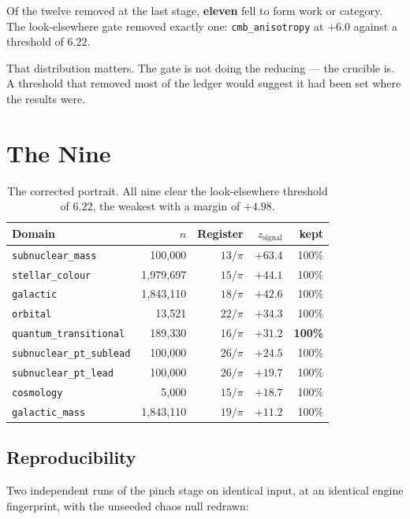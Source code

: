 \documentclass[11pt, letterpaper, openany]{book}
\begin{document}
Of the twelve removed at the last stage, \textbf{eleven} fell to form work or category. The
look-elsewhere gate removed exactly one: \texttt{cmb\_anisotropy} at $+6.0$ against a threshold
of $6.22$.

That distribution matters. The gate is not doing the reducing --- the crucible is. A threshold
that removed most of the ledger would suggest it had been set where the results were.

\section{The Nine}

\begin{table}[H]
\centering
\small
\begin{tabular}{@{}lrrrr@{}}
\toprule
\textbf{Domain} & \textbf{$n$} & \textbf{Register} & \textbf{$z_{\text{signal}}$} & \textbf{kept} \\
\midrule
\texttt{subnuclear\_mass} & 100{,}000 & $13/\pi$ & $+63.4$ & 100\% \\
\texttt{stellar\_colour} & 1{,}979{,}697 & $15/\pi$ & $+44.1$ & 100\% \\
\texttt{galactic} & 1{,}843{,}110 & $18/\pi$ & $+42.6$ & 100\% \\
\texttt{orbital} & 13{,}521 & $22/\pi$ & $+34.3$ & 100\% \\
\texttt{quantum\_transitional} & 189{,}330 & $16/\pi$ & $+31.2$ & \textbf{100\%} \\
\texttt{subnuclear\_pt\_sublead} & 100{,}000 & $26/\pi$ & $+24.5$ & 100\% \\
\texttt{subnuclear\_pt\_lead} & 100{,}000 & $26/\pi$ & $+19.7$ & 100\% \\
\texttt{cosmology} & 5{,}000 & $15/\pi$ & $+18.7$ & 100\% \\
\texttt{galactic\_mass} & 1{,}843{,}110 & $19/\pi$ & $+11.2$ & 100\% \\
\bottomrule
\end{tabular}
\caption{The corrected portrait. All nine clear the look-elsewhere threshold of $6.22$, the
weakest with a margin of $+4.98$.}
\end{table}

\subsection{Reproducibility}

Two independent runs of the pinch stage on identical input, at an identical engine fingerprint,
with the unseeded chaos null redrawn:
\end{document}
